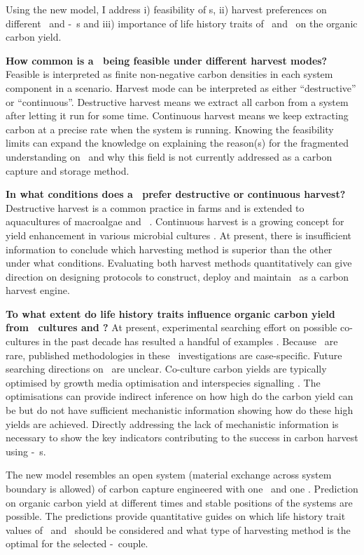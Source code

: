 \documentclass[../thesis.tex]{subfiles} %
\begin{document}
Using the new model, I address \Rn{1}) feasibility of \pbs s, \Rn{2}) harvest preferences on different \phy\ and \phy-\bac\ \pbs s and \Rn{3}) importance of life history traits of \phy\ and \bac\ on the organic carbon yield.

\textbf{How common is a \pbs\ being feasible under different harvest modes?}  Feasible is interpreted as finite non-negative carbon densities in each system component in a scenario.  Harvest mode can be interpreted as either ``destructive” or ``continuous”.  Destructive harvest means we extract all carbon from a system after letting it run for some time.  Continuous harvest means we keep extracting carbon at a precise rate when the system is running.  Knowing the feasibility limits can expand the knowledge on explaining the reason(s) for the fragmented understanding \autocite{fuentes2016impact} on \pbs\ and why this field is not currently addressed as a carbon capture and storage method.

\textbf{In what conditions does a \pbs\ prefer destructive or continuous harvest?}  Destructive harvest is a common practice in farms and is extended to aquacultures of macroalgae \autocite{duarte2017can} and \phy\  \autocite{evanson_2019}.  Continuous harvest is a growing concept for yield enhancement in various microbial cultures \autocite{aytekin2016statistical,fuentes2016impact}.  At present, there is insufficient information to conclude which harvesting method is superior than the other under what conditions.  Evaluating both harvest methods quantitatively can give direction on designing protocols to construct, deploy and maintain \pbs\ as a carbon harvest engine.

\textbf{To what extent do life history traits influence organic carbon yield from \phy\ cultures and \pbs?}  At present, experimental searching effort on possible co-cultures in the past decade has resulted a handful of examples \autocite{fuentes2016impact,santos2014microalgal}.  Because \pbs\ are rare, published methodologies in these \pbs\ investigations are case-specific.  Future searching directions on \pbs\ are unclear.  Co-culture carbon yields are typically optimised by growth media optimisation \autocite{aytekin2016statistical,fuentes2016impact} and interspecies signalling \autocite{fuentes2016impact}.  The optimisations can provide indirect inference on how high do the carbon yield can be but do not have sufficient mechanistic information showing how do these high yields are achieved.  Directly addressing the lack of mechanistic information is necessary to show the key indicators contributing to the success in carbon harvest using \phy-\bac\ \pbs s.

The new model resembles an open system (material exchange across system boundary is allowed) of carbon capture engineered with one \phy\ and one \bac.  Prediction on organic carbon yield at different times and stable positions of the systems are possible.  The predictions provide quantitative guides on which life history trait values of \phy\ and \bac\ should be considered and what type of harvesting method is the optimal for the selected \phy-\bac\ couple.
\end{document}
